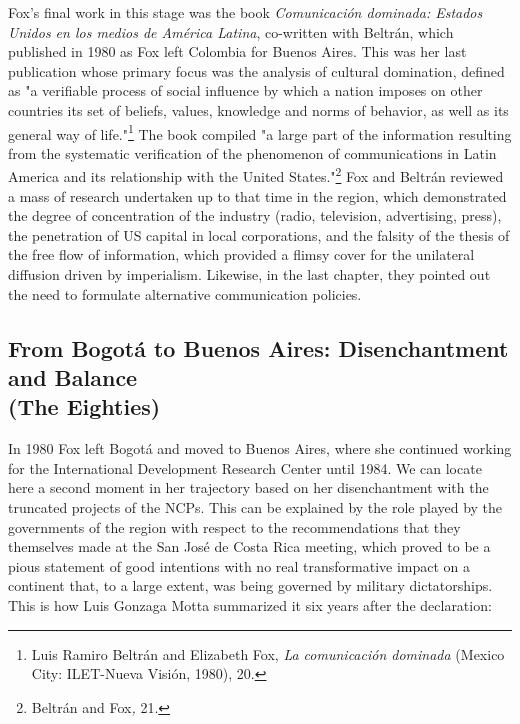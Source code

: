 \documentclass{tufte-handout}
\begin{document}
Fox's final work in this stage was the book \emph{Comunicación dominada:
Estados Unidos en los medios de América Latina}, co-written with
Beltrán, which published in 1980 as Fox left Colombia for Buenos Aires.
This was her last publication whose primary focus was the analysis of
cultural domination, defined as "a verifiable process of social
influence by which a nation imposes on other countries its set of
beliefs, values, knowledge and norms of behavior, as well as its general
way of life."\footnote{Luis Ramiro Beltrán and Elizabeth Fox, \emph{La
  comunicación dominada} (Mexico City: ILET-Nueva Visión, 1980), 20.}
The book compiled "a large part of the information resulting from the
systematic verification of the phenomenon of communications in Latin
America and its relationship with the United States."\footnote{Beltrán
  and Fox\emph{,} 21.} Fox and Beltrán reviewed a mass of research
undertaken up to that time in the region, which demonstrated the degree
of concentration of the industry (radio, television, advertising,
press), the penetration of US capital in local corporations, and the
falsity of the thesis of the free flow of information, which provided a
flimsy cover for the unilateral diffusion driven by imperialism.
Likewise, in the last chapter, they pointed out the need to formulate
alternative communication policies.

\newpage\hypertarget{from-bogot-to-buenos-aires-disenchantment-and-balance-the-eighties}{%
\subsection{From Bogotá to Buenos Aires:
Disenchantment and Balance\\\noindent (The
Eighties)}\label{from-bogot-to-buenos-aires-disenchantment-and-balance-the-eighties}}

In 1980 Fox left Bogotá and moved to Buenos Aires, where she continued
working for the International Development Research Center until 1984. We
can locate here a second moment in her trajectory based on her
disenchantment with the truncated projects of the NCPs. This can be
explained by the role played by the governments of the region with
respect to the recommendations that they themselves made at the San José
de Costa Rica meeting, which proved to be a pious statement of good
intentions with no real transformative impact on a continent that, to a
large extent, was being governed by military dictatorships. This is how
Luis Gonzaga Motta summarized it six years after the declaration:
\end{document}
